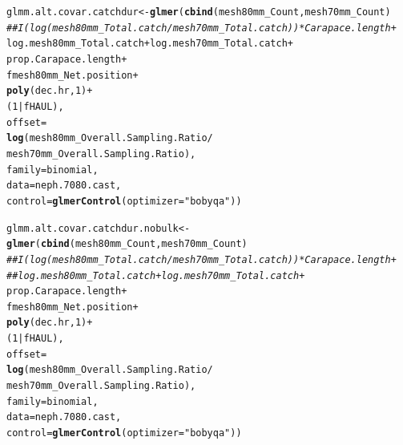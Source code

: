\documentclass[12pt]{article}\usepackage[]{graphicx}\usepackage[]{color}
\makeatletter
\newcommand{\hlnum}[1]{\textcolor[rgb]{0.686,0.059,0.569}{#1}}%
\newcommand{\hlstr}[1]{\textcolor[rgb]{0.192,0.494,0.8}{#1}}%
\newcommand{\hlcom}[1]{\textcolor[rgb]{0.678,0.584,0.686}{\textit{#1}}}%
\newcommand{\hlopt}[1]{\textcolor[rgb]{0,0,0}{#1}}%
\newcommand{\hlstd}[1]{\textcolor[rgb]{0.345,0.345,0.345}{#1}}%
\newcommand{\hlkwb}[1]{\textcolor[rgb]{0.69,0.353,0.396}{#1}}%
\newcommand{\hlkwc}[1]{\textcolor[rgb]{0.333,0.667,0.333}{#1}}%
\newcommand{\hlkwd}[1]{\textcolor[rgb]{0.737,0.353,0.396}{\textbf{#1}}}%
\newenvironment{kframe}{%
 \def\at@end@of@kframe{}%
 \ifinner\ifhmode%
  \def\at@end@of@kframe{\end{minipage}}%
  \begin{minipage}{\columnwidth}%
 \fi\fi%
 \def\FrameCommand##1{\hskip\@totalleftmargin \hskip-\fboxsep
 \colorbox{shadecolor}{##1}\hskip-\fboxsep
     \hskip-\linewidth \hskip-\@totalleftmargin \hskip\columnwidth}%
 \MakeFramed {\advance\hsize-\width
   \@totalleftmargin\z@ \linewidth\hsize
   \@setminipage}}%
 {\par\unskip\endMakeFramed%
 \at@end@of@kframe}
\newenvironment{knitrout}{}{} %
\makeatother
\begin{document}
\begin{knitrout}
\begin{kframe}
\begin{alltt}
\hlstd{glmm.alt.covar.catchdur} \hlkwb{<-} \hlkwd{glmer}\hlstd{(}\hlkwd{cbind}\hlstd{(mesh80mm_Count, mesh70mm_Count)} \hlopt{~}
                                 \hlcom{##I(log(mesh80mm_Total.catch / mesh70mm_Total.catch)) * Carapace.length +}
                                 \hlstd{log.mesh80mm_Total.catch} \hlopt{+} \hlstd{log.mesh70mm_Total.catch} \hlopt{+}
                                 \hlstd{prop.Carapace.length} \hlopt{+}
                                 \hlstd{fmesh80mm_Net.position} \hlopt{+}
                                 \hlkwd{poly}\hlstd{(dec.hr,} \hlnum{1}\hlstd{)} \hlopt{+}
                                 \hlstd{(}\hlnum{1} \hlopt{|} \hlstd{fHAUL),}
                                 \hlkwc{offset} \hlstd{=}
                                 \hlkwd{log}\hlstd{(mesh80mm_Overall.Sampling.Ratio} \hlopt{/}
                                     \hlstd{mesh70mm_Overall.Sampling.Ratio),}
                                 \hlkwc{family} \hlstd{= binomial,}
                                 \hlkwc{data} \hlstd{= neph.7080.cast,}
                                 \hlkwc{control}\hlstd{=}\hlkwd{glmerControl}\hlstd{(}\hlkwc{optimizer}\hlstd{=}\hlstr{"bobyqa"}\hlstd{))}

\hlstd{glmm.alt.covar.catchdur.nobulk} \hlkwb{<-} \hlkwd{glmer}\hlstd{(}\hlkwd{cbind}\hlstd{(mesh80mm_Count, mesh70mm_Count)} \hlopt{~}
                                        \hlcom{##I(log(mesh80mm_Total.catch / mesh70mm_Total.catch)) * Carapace.length +}
                                        \hlcom{##log.mesh80mm_Total.catch + log.mesh70mm_Total.catch + }
                                        \hlstd{prop.Carapace.length} \hlopt{+}
                                        \hlstd{fmesh80mm_Net.position} \hlopt{+}
                                        \hlkwd{poly}\hlstd{(dec.hr,} \hlnum{1}\hlstd{)} \hlopt{+}
                                        \hlstd{(}\hlnum{1} \hlopt{|} \hlstd{fHAUL),}
                                        \hlkwc{offset} \hlstd{=}
                                        \hlkwd{log}\hlstd{(mesh80mm_Overall.Sampling.Ratio} \hlopt{/}
                                            \hlstd{mesh70mm_Overall.Sampling.Ratio),}
                                        \hlkwc{family} \hlstd{= binomial,}
                                        \hlkwc{data} \hlstd{= neph.7080.cast,}
                                        \hlkwc{control}\hlstd{=}\hlkwd{glmerControl}\hlstd{(}\hlkwc{optimizer}\hlstd{=}\hlstr{"bobyqa"}\hlstd{))}


\end{alltt}
\end{kframe}
\end{knitrout}
\end{document}
